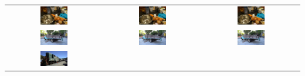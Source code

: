\begin{tabular}{ccc}
            \includegraphics[width=0.3\textwidth]{../o-3dgs/eval/counter/test/ours_30000/gt/00000.png} &
            \includegraphics[width=0.3\textwidth]{../o-3dgs/eval/counter/test/ours_30000/renders/00000.png} & 
            \includegraphics[width=0.3\textwidth]{../o-3dgs/eval/counter/test/ours_30000/renders/00000.png} \\
            \includegraphics[width=0.3\textwidth]{../o-3dgs/eval/truck/test/ours_30000/gt/00000.png} &
            \includegraphics[width=0.3\textwidth]{../o-3dgs/eval/truck/test/ours_30000/renders/00000.png} & 
            \includegraphics[width=0.3\textwidth]{../o-3dgs/eval/truck/test/ours_30000/renders/00000.png} \\
            \includegraphics[width=0.3\textwidth]{../o-3dgs/eval/train/test/ours_30000/gt/00000.png} &

\end{tabular}
